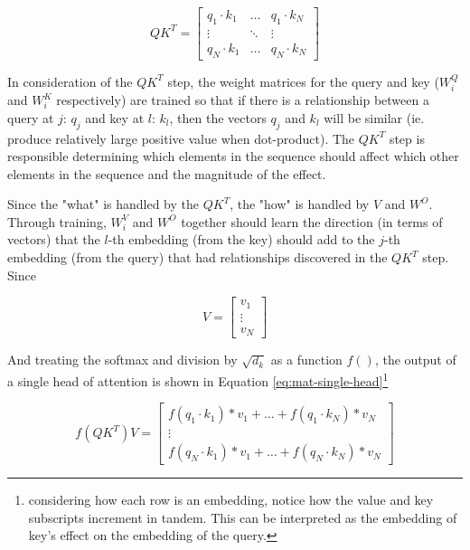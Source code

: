 \begin{equation}
    \label{eq:qkt}
    QK^T = \begin{bmatrix}
        q_1 \cdot k_1  & \dots & q_1 \cdot k_N \\
        \vdots & \ddots & \vdots \\
        q_N \cdot k_1 & \dots & q_N \cdot k_N
    \end{bmatrix}
\end{equation}

In consideration of the $QK^T$ step, the weight matrices for the query and key ($W_i^Q$ and $W_i^K$ respectively) are trained so that if there is a relationship between a query at $j$: $q_j$ and key at $l$: $k_l$, then the vectors $q_j$ and $k_l$ will be similar (ie. produce relatively large positive value when dot-product). The $QK^T$ step is responsible determining which elements in the sequence should affect which other elements in the sequence and the magnitude of the effect.

Since the "what" is handled by the $QK^T$, the "how" is handled by $V$ and $W^O$. Through training, $W^V_i$ and $W^O$ together should learn the direction (in terms of vectors) that the $l$-th embedding (from the key) should add to the $j$-th embedding (from the query) that had relationships discovered in the $QK^T$ step. Since

\begin{equation}
    V = \begin{bmatrix}
        v_1 \\
        \vdots \\
        v_N
    \end{bmatrix}
\end{equation}

And treating the softmax and division by $\sqrt{d_k}$ as a function $f()$, the output of a single head of attention is shown in Equation \ref{eq:mat-single-head}\footnote{considering how each row is an embedding, notice how the value and key subscripts increment in tandem. This can be interpreted as the embedding of key's effect on the embedding of the query.}

\begin{equation}
    \label{eq:mat-single-head}
    f(QK^T)V = \begin{bmatrix}
        f(q_1 \cdot k_1) * v_1 + \dots + f(q_1 \cdot k_N) * v_N \\
        \vdots \\
        f(q_N \cdot k_1) * v_1 + \dots + f(q_N \cdot k_N) * v_N
    \end{bmatrix}
\end{equation}


